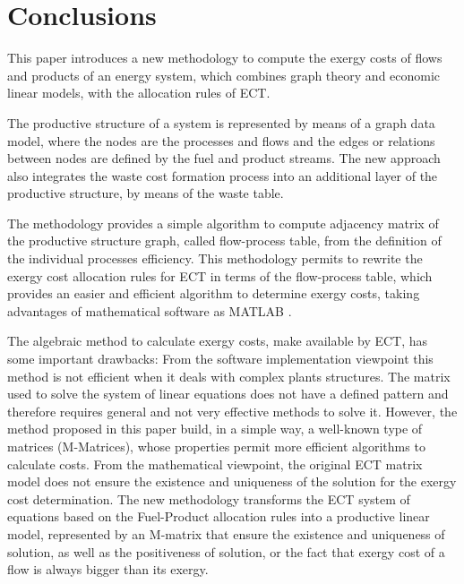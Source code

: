 \documentclass{ecos2018}
\begin{document}
\section{Conclusions}
This paper introduces a new methodology to compute the exergy costs of flows and products of an energy system, which combines graph theory and economic linear models, with the allocation rules of ECT.

The productive structure of a system is represented by means of a graph data model, where the nodes are the processes and flows and the edges or relations between nodes are defined by the fuel and product streams. The new approach also integrates the waste cost formation process into an additional layer of the productive structure, by means of the waste table.

The methodology provides a simple algorithm to compute adjacency matrix of the productive structure graph, called flow-process table, from the definition of the individual processes efficiency. This methodology permits to rewrite the exergy cost allocation rules for ECT in terms of the flow-process table, which provides an easier and efficient algorithm to determine exergy costs, taking advantages of  mathematical software as MATLAB \circledR.

The algebraic method to calculate exergy costs, make available by ECT, has some important drawbacks:
From the software implementation viewpoint this method is not efficient when it deals with complex plants structures. The matrix used to solve the system of linear equations does not have a defined pattern and therefore requires general and not very effective methods to solve it. However, the method proposed in this paper build, in a simple way, a well-known type of matrices (M-Matrices), whose properties permit more efficient algorithms to calculate costs. From the mathematical viewpoint, the original ECT matrix model does not ensure the existence and uniqueness of the solution for the exergy cost determination. The new methodology transforms the ECT system of equations based on the Fuel-Product allocation rules into a productive linear model, represented by an M-matrix that ensure the existence and uniqueness of solution, as well as the positiveness of solution, or the fact that exergy cost of a flow is always bigger than its exergy.
\end{document}
